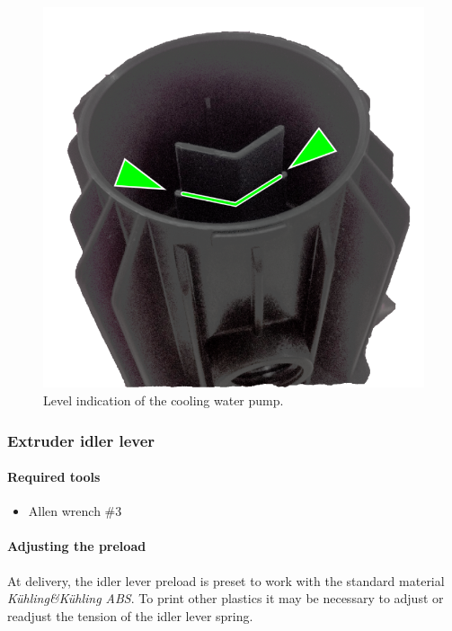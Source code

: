 \begin{figure}[H]
  \centering
  \includegraphics[width=.7\linewidth]{./img/mtc_coolingwaterpumprefill.png}
  \caption{Level indication of the cooling water pump.}
\end{figure}


\subsubsection{Extruder idler lever}

\paragraph{Required tools}

\begin{itemize}
  \item Allen wrench \#3 
\end{itemize}	

\paragraph{Adjusting the preload}

At delivery, the idler lever preload is preset to work with the standard material \emph{Kühling\&Kühling ABS}. To print other plastics it may be necessary to adjust or readjust the tension of the idler lever spring. 

